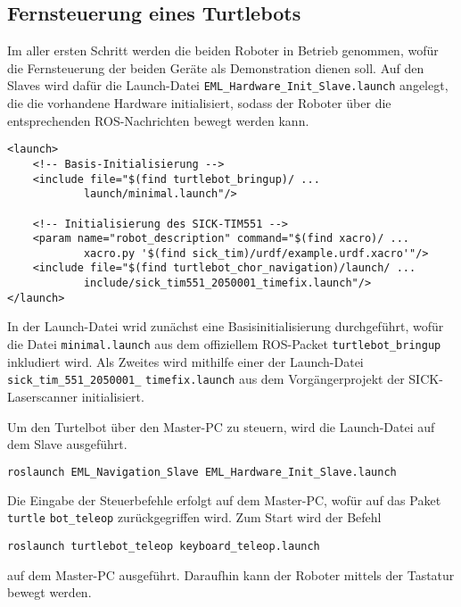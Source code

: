 \subsection{Fernsteuerung eines Turtlebots}
Im aller ersten Schritt werden die beiden Roboter in Betrieb genommen, wofür die Fernsteuerung der beiden Geräte als Demonstration dienen soll. Auf den Slaves wird dafür die Launch-Datei \lstinline{EML_Hardware_Init_Slave.launch}{} angelegt, die die vorhandene Hardware initialisiert, sodass der Roboter über die entsprechenden ROS-Nachrichten bewegt werden kann.
\begin{lstlisting}[caption={EML\_Hardware\_Init\_Slave.launch},captionpos=b]
<launch>
	<!-- Basis-Initialisierung -->
	<include file="$(find turtlebot_bringup)/ ...
			launch/minimal.launch"/>
	
	<!-- Initialisierung des SICK-TIM551 -->
	<param name="robot_description" command="$(find xacro)/ ...
			xacro.py '$(find sick_tim)/urdf/example.urdf.xacro'"/>
	<include file="$(find turtlebot_chor_navigation)/launch/ ...
			include/sick_tim551_2050001_timefix.launch"/>
</launch>
\end{lstlisting}
In der Launch-Datei wrid zunächst eine Basisinitialisierung durchgeführt, wofür die Datei \lstinline{minimal.launch}{} aus dem offiziellem ROS-Packet \lstinline{turtlebot_bringup}{}\cite{WikiTurtlebotBringup} inkludiert wird. Als Zweites wird mithilfe einer der Launch-Datei \lstinline{sick_tim_551_2050001_} \lstinline{timefix.launch}{} aus dem Vorgängerprojekt \cite{Turtleboys} der SICK-Laserscanner initialisiert.

Um den Turtelbot über den Master-PC zu steuern, wird die Launch-Datei auf dem Slave ausgeführt.
\begin{lstlisting}[language=bash]
roslaunch EML_Navigation_Slave EML_Hardware_Init_Slave.launch
\end{lstlisting}
Die Eingabe der Steuerbefehle erfolgt auf dem Master-PC, wofür auf das Paket \lstinline{turtle}{} \lstinline{bot_teleop}{} \cite{WikiTurtlebotTeleop} zurückgegriffen wird. Zum Start wird der Befehl
\begin{lstlisting}
roslaunch turtlebot_teleop keyboard_teleop.launch
\end{lstlisting}
auf dem Master-PC ausgeführt. Daraufhin kann der Roboter mittels der Tastatur bewegt werden.

\newpage
